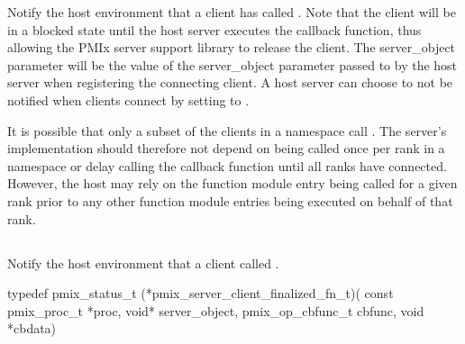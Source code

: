\descr

Notify the host environment that a client has called .
Note that the client will be in a blocked state until the host server executes the callback function, thus allowing the \ac{PMIx} server support library to release
the client.
The server_object parameter will be the value of the server_object parameter passed to
 by the host server when registering the connecting client. A host server can choose to not be notified when clients connect by setting  to .

It is possible that only a subset of the clients in a namespace call
.   The server's 
implementation should therefore not depend on being called once per rank in a
namespace or delay calling the callback function until all ranks have
connected. However, the host may rely on the
function module entry being called for a given rank prior to any other function
module entries being executed on behalf of that rank.

\subsection{}

\summary

Notify the host environment that a client called .

\format

\cspecificstart
\begin{codepar}
typedef pmix_status_t (*pmix_server_client_finalized_fn_t)(
                             const pmix_proc_t *proc,
                             void* server_object,
                             pmix_op_cbfunc_t cbfunc,
                             void *cbdata)
\end{codepar}
\cspecificend

\begin{arglist}
\end{arglist}


